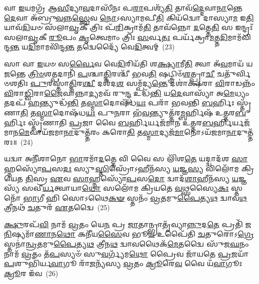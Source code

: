 𑌵𑌾 \ul{𑌇}\-𑌯𑌮𑌗𑍍𑌰᳴ 𑌆\-\ul{𑌸𑍀}\-𑌦𑍍𑌯𑌾\-\ul{𑌵}\-𑌦𑌾𑌸𑍀᳴𑌨𑌃 𑌪\-\ul{𑌰𑌾}\-𑌪𑌶𑍍𑌯᳴\-\ul{𑌤𑌿} 𑌤𑌾𑌵᳴\-\ul{𑌦𑍍𑌦𑍇}\-𑌵𑌾\-\ul{𑌨𑌾}\-𑌨𑍍𑌤𑍇 \ul{𑌦𑍇}\-𑌵𑌾 𑌅᳴𑌬𑍍𑌰𑍁\-\ul{𑌵}\-𑌨𑍍𑌨\-\ul{𑌸𑍍𑌤𑍍𑌵𑍇}\-𑌵 \ul{𑌨𑍋}\-\-𑌽𑌸𑍍𑌯𑌾𑌮𑌪𑍀\-\ul{𑌤𑌿} 𑌕𑌿𑌯᳴𑌦𑍍𑌵𑍋 𑌦𑌾𑌸𑍍𑌯𑌾\-\ul{𑌮} 𑌇\-\ul{𑌤𑌿} 𑌯𑌾𑌵᳴\-\ul{𑌦𑌿}\-𑌯𑍞 𑌸᳴𑌲𑌾\-\ul{𑌵𑍃}\-𑌕𑍀 𑌤𑍍𑌰𑌿𑌃 𑌪᳴\-\ul{𑌰𑌿}\-𑌕𑍍𑌰𑌾𑌮᳴\-\ul{𑌤𑌿} 𑌤𑌾𑌵᳴𑌨𑍍𑌨𑍋 \ul{𑌦}\-𑌤𑍍𑌤𑍇\-\ul{𑌤𑌿} 𑌸 𑌇𑌨𑍍𑌦𑍍𑌰𑌃᳴ 𑌸𑌲𑌾\-\ul{𑌵𑍃}\-𑌕𑍀 \ul{𑌰𑍂}\-𑌪𑌂 \ul{𑌕𑍃}\-𑌤𑍍𑌵𑍇𑌮𑌾𑌂 𑌤𑍍𑌰𑌿𑌃 \ul{𑌸}\-𑌰𑍍𑌵\-\ul{𑌤𑌃} 𑌪𑌰𑍍𑌯᳴𑌕𑍍𑌰𑌾\-\ul{𑌮}\-𑌤𑍍𑌤\-\ul{𑌦𑌿}\-𑌮𑌾𑌮᳴𑌵𑌿𑌨𑍍𑌦\-\ul{𑌨𑍍𑌤} 𑌯\-\ul{𑌦𑌿}\-𑌮𑌾𑌮𑌵𑌿᳴𑌨𑍍𑌦\-\ul{𑌨𑍍𑌤} 𑌤𑌦𑍍𑌵𑍇𑌦𑍍𑌯𑍈᳴ 𑌵𑍇\-\ul{𑌦𑌿}\-𑌤𑍍𑌵𑌮𑍍~(23)

𑌸𑌾 𑌵𑌾 \ul{𑌇}\-𑌯𑍞 𑌸\-\ul{𑌰𑍍𑌵𑍈}\-𑌵 𑌵𑍇\-\ul{𑌦𑌿}\-𑌰𑌿𑌯᳴𑌤𑌿 𑌶\-\ul{𑌕𑍍𑌷𑍍𑌯𑌾}\-𑌮𑍀\-\ul{𑌤𑌿} 𑌤𑍍𑌵𑌾 𑌅᳴\-\ul{𑌵}\-𑌮𑌾𑌯᳴ 𑌯𑌜𑌨𑍍𑌤𑍇 \ul{𑌤𑍍𑌰𑌿}\-\-\ul{𑍞}\-𑌶\-\ul{𑌤𑍍𑌪}\-𑌦𑌾𑌨𑌿᳴ \ul{𑌪}\-𑌶𑍍𑌚𑌾\-\ul{𑌤𑍍𑌤𑌿}\-𑌰𑌶𑍍𑌚𑍀᳴ 𑌭𑌵\-\ul{𑌤𑌿} 𑌷𑌟𑍍𑌤𑍍𑌰𑌿𑍞᳴\-\ul{𑌶}\-𑌤𑍍𑌪𑍍𑌰𑌾\-\ul{𑌚𑍀} 𑌚𑌤𑍁᳴𑌰𑍍𑌵𑌿𑍞𑌶𑌤𑌿𑌃 \ul{𑌪𑍁}\-𑌰𑌸𑍍𑌤𑌾॑\-\ul{𑌤𑍍𑌤𑌿}\-𑌰\-\ul{𑌶𑍍𑌚𑍀} 𑌦𑌶᳴𑌦\-\ul{𑌶} 𑌸𑌮𑍍𑌪᳴𑌦𑍍𑌯\-\ul{𑌨𑍍𑌤𑍇} 𑌦𑌶𑌾॑𑌕𑍍𑌷𑌰𑌾 \ul{𑌵𑌿}\-𑌰𑌾𑌡𑌨𑍍𑌨𑌂᳴ \ul{𑌵𑌿}\-𑌰𑌾\-\ul{𑌡𑍍𑌵𑌿}\-𑌰𑌾\-\ul{𑌜𑍈}\-𑌵𑌾𑌨𑍍𑌨𑌾\-\ul{𑌦𑍍𑌯}\-𑌮𑌵᳴ 𑌰𑍁\-\ul{𑌨𑍍𑌦𑍍𑌧} 𑌉𑌦𑍍𑌧᳴\-\ul{𑌨𑍍𑌤𑌿} 𑌯\-\ul{𑌦𑍇}\-𑌵𑌾𑌸𑍍𑌯𑌾᳴ 𑌅\-\ul{𑌮𑍇}\-𑌧𑍍𑌯𑌂 𑌤𑌦𑌪᳴ \ul{𑌹}\-𑌨𑍍𑌤𑍍𑌯𑍁𑌦𑍍𑌧᳴\-\ul{𑌨𑍍𑌤𑌿} 𑌤\-\ul{𑌸𑍍𑌮𑌾}\-𑌦𑍋𑌷᳴𑌧\-\ul{𑌯𑌃} 𑌪𑌰𑌾᳴ 𑌭𑌵𑌨𑍍𑌤𑌿 \ul{𑌬}\-𑌰𑍍\mbox{}𑌹𑌿𑌃 𑌸𑍍𑌤𑍃᳴𑌣𑌾\-\ul{𑌤𑌿} 𑌤\-\ul{𑌸𑍍𑌮𑌾}\-𑌦𑍋𑌷᳴𑌧\-\ul{𑌯𑌃} 𑌪𑍁\-\ul{𑌨}\-𑌰𑌾 𑌭᳴\-\ul{𑌵}\-𑌨𑍍𑌤𑍍𑌯𑍁𑌤𑍍𑌤᳴𑌰\-\ul{𑌮𑍍𑌬}\-𑌰𑍍\mbox{}𑌹𑌿𑌷᳴ 𑌉𑌤𑍍𑌤𑌰\-\ul{𑌬}\-𑌰𑍍\mbox{}𑌹𑌿𑌃 𑌸𑍍𑌤𑍃᳴𑌣𑌾𑌤𑌿 \ul{𑌪𑍍𑌰}\-𑌜𑌾 𑌵𑍈 \ul{𑌬}\-𑌰𑍍\mbox{}𑌹𑌿𑌰𑍍𑌯𑌜᳴𑌮𑌾𑌨 𑌉𑌤𑍍𑌤𑌰\-\ul{𑌬}\-𑌰𑍍\mbox{}𑌹𑌿𑌰𑍍𑌯𑌜᳴𑌮𑌾𑌨\-\ul{𑌮𑍇}\-𑌵𑌾𑌯᳴𑌜𑌮𑌾\-\ul{𑌨𑌾}\-𑌦𑍁𑌤𑍍𑌤᳴𑌰𑌂 𑌕𑌰𑍋\-\ul{𑌤𑌿} 𑌤\-\ul{𑌸𑍍𑌮𑌾}\-𑌦𑍍𑌯𑌜᳴\-\ul{𑌮𑌾}\-𑌨𑍋\-𑌽𑌯᳴𑌜𑌮𑌾\-\ul{𑌨𑌾}\-𑌦𑍁𑌤𑍍𑌤᳴𑌰𑌃॥~(24)

{}%

𑌯𑌦𑍍𑌵𑌾 𑌅𑌨𑍀᳴𑌶𑌾𑌨𑍋 \ul{𑌭𑌾}\-𑌰𑌮𑌾᳴\-\ul{𑌦}\-𑌤𑍍𑌤𑍇 𑌵𑌿 𑌵𑍈 𑌸 𑌲𑌿᳴𑌶\-\ul{𑌤𑍇} 𑌯𑌦𑍍𑌦𑍍𑌵𑌾𑌦᳴𑌶 \ul{𑌸𑌾}\-𑌹𑍍𑌨𑌸𑍍𑌯𑍋᳴\-\ul{𑌪}\-𑌸\-\ul{𑌦𑌃} 𑌸𑍍𑌯𑍁\-\ul{𑌸𑍍𑌤𑌿}\-𑌸𑍍𑌰𑍋᳴\-𑌽𑌹𑍀𑌨᳴𑌸𑍍𑌯 \ul{𑌯}\-𑌜𑍍𑌞\-\ul{𑌸𑍍𑌯} 𑌵𑌿𑌲𑍋᳴𑌮 𑌕𑍍𑌰𑌿𑌯𑍇𑌤 \ul{𑌤𑌿}\-𑌸𑍍𑌰 \ul{𑌏}\-𑌵 \ul{𑌸𑌾}\-𑌹𑍍𑌨𑌸𑍍𑌯𑍋᳴\-\ul{𑌪}\-𑌸\-\ul{𑌦𑍋} 𑌦𑍍𑌵𑌾𑌦᳴\-\ul{𑌶𑌾}\-𑌹𑍀𑌨᳴𑌸𑍍𑌯 \ul{𑌯}\-𑌜𑍍𑌞𑌸𑍍𑌯᳴ 𑌸𑌵𑍀\-\ul{𑌰𑍍𑌯}\-𑌤𑍍𑌵𑌾𑌯𑌾\-\ul{𑌥𑍋} 𑌸𑌲𑍋᳴𑌮 𑌕𑍍𑌰𑌿𑌯𑌤𑍇 \ul{𑌵}\-𑌥𑍍𑌸𑌸𑍍𑌯𑍈\-\ul{𑌕𑌃} 𑌸𑍍𑌤𑌨𑍋᳴ \ul{𑌭𑌾}\-𑌗𑍀 𑌹𑌿 𑌸𑍋\-𑌽𑌥𑍈\-\ul{𑌕}\-\-\ul{𑍟} 𑌸𑍍𑌤𑌨𑌂᳴ \ul{𑌵𑍍𑌰}\-𑌤𑌮𑍁\-\ul{𑌪𑍈}\-𑌤𑍍𑌯\-\ul{𑌥} 𑌦𑍍𑌵𑌾𑌵\-\ul{𑌥} 𑌤𑍍𑌰𑍀𑌨𑌥᳴ \ul{𑌚}\-𑌤𑍁𑌰᳴ \ul{𑌏}\-𑌤𑌦𑍍𑌵𑍈~(25)

\-\ul{𑌕𑍍𑌷𑍁}\-𑌰𑌪᳴\-\ul{𑌵𑌿} 𑌨𑌾𑌮᳴ \ul{𑌵𑍍𑌰}\-𑌤𑌂 𑌯𑍇\-\ul{𑌨} 𑌪𑍍𑌰 \ul{𑌜𑌾}\-𑌤𑌾𑌨𑍍𑌭𑍍𑌰𑌾𑌤𑍃᳴𑌵𑍍𑌯𑌾\-\ul{𑌨𑍍𑌨𑍁}\-𑌦\-\ul{𑌤𑍇} 𑌪𑍍𑌰𑌤𑌿᳴ 𑌜\-\ul{𑌨𑌿}\-𑌷𑍍𑌯𑌮𑌾᳴\-\ul{𑌣𑌾}\-𑌨\-\ul{𑌥𑍋} 𑌕𑌨𑍀᳴𑌯\-\ul{𑌸𑍈}\-𑌵 𑌭𑍂\-\ul{𑌯} 𑌉𑌪𑍈᳴𑌤𑌿 \ul{𑌚}\-𑌤𑍁𑌰𑍋\-𑌽\-\ul{𑌗𑍍𑌰𑍇} 𑌸𑍍𑌤𑌨𑌾॑\-\ul{𑌨𑍍𑌵𑍍𑌰}\-𑌤𑌮𑍁\-\ul{𑌪𑍈}\-𑌤𑍍𑌯\-\ul{𑌥} 𑌤𑍍𑌰𑍀𑌨\-\ul{𑌥} 𑌦𑍍𑌵𑌾𑌵𑌥𑍈𑌕᳴\-\ul{𑌮𑍇}\-𑌤𑌦𑍍𑌵𑍈 𑌸𑍁᳴𑌜\-\ul{𑌘}\-𑌨𑌂 𑌨𑌾𑌮᳴ \ul{𑌵𑍍𑌰}\-𑌤𑌂 𑌤᳴\-\ul{𑌪}\-𑌸𑍍𑌯𑍞᳴ 𑌸𑍁\-\ul{𑌵}\-𑌰𑍍𑌗𑍍𑌯᳴𑌮\-\ul{𑌥𑍋} 𑌪𑍍𑌰𑍈𑌵 𑌜𑌾᳴𑌯𑌤𑍇 \ul{𑌪𑍍𑌰}\-𑌜𑌯𑌾᳴ \ul{𑌪}\-𑌶𑍁𑌭𑌿᳴𑌰𑍍𑌯\-\ul{𑌵𑌾}\-𑌗𑍂 𑌰𑌾᳴\-\ul{𑌜}\-𑌨𑍍𑌯᳴𑌸𑍍𑌯 \ul{𑌵𑍍𑌰}\-𑌤𑌂 \ul{𑌕𑍍𑌰𑍂}\-𑌰𑍇\-\ul{𑌵} 𑌵𑍈 𑌯᳴\-\ul{𑌵𑌾}\-𑌗𑍂𑌃 \ul{𑌕𑍍𑌰𑍂}\-𑌰 𑌇᳴𑌵~(26)

